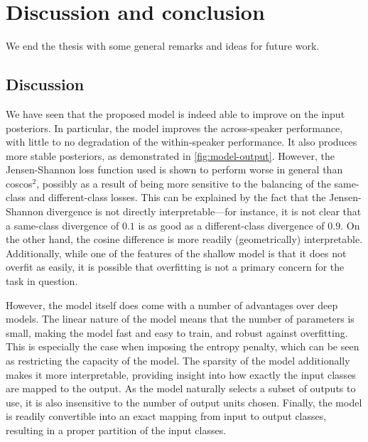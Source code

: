 %
%
%

\chapter{Discussion and conclusion}
\label{ch:discussion}

We end the thesis with some general remarks and ideas for future work.

\section{Discussion}
We have seen that the proposed model is indeed able to improve on the input posteriors.
In particular, the model improves the across-speaker performance, with little to no degradation of the within-speaker performance.
It also produces more stable posteriors, as demonstrated in \cref{fig:model-output}.
However, the Jensen-Shannon loss function used is shown to perform worse in general than coscos$^2$, possibly as a result of being more sensitive to the balancing of the same-class and different-class losses.
This can be explained by the fact that the Jensen-Shannon divergence is not directly interpretable---for instance, it is not clear that a same-class divergence of $0.1$ is as good as a different-class divergence of $0.9$.
On the other hand, the cosine difference is more readily (geometrically) interpretable.
Additionally, while one of the features of the shallow model is that it does not overfit as easily, it is possible that overfitting is not a primary concern for the task in question.

However, the model itself does come with a number of advantages over deep models.
The linear nature of the model means that the number of parameters is small, making the model fast and easy to train, and robust against overfitting.
This is especially the case when imposing the entropy penalty, which can be seen as restricting the capacity of the model.
The sparsity of the model additionally makes it more interpretable, providing insight into how exactly the input classes are mapped to the output.
As the model naturally selects a subset of outputs to use, it is also insensitive to the number of output units chosen.
Finally, the model is readily convertible into an exact mapping from input to output classes, resulting in a proper partition of the input classes.

